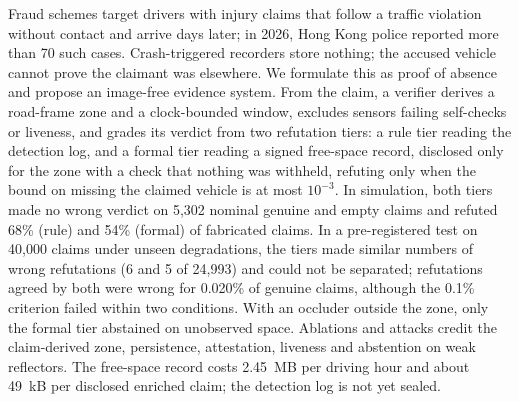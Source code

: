 Fraud schemes target drivers with injury claims that follow a traffic violation without contact and arrive days later; in 2026, Hong Kong police reported more than 70 such cases. Crash-triggered recorders store nothing; the accused vehicle cannot prove the claimant was elsewhere. We formulate this as proof of absence and propose an image-free evidence system. From the claim, a verifier derives a road-frame zone and a clock-bounded window, excludes sensors failing self-checks or liveness, and grades its verdict from two refutation tiers: a rule tier reading the detection log, and a formal tier reading a signed free-space record, disclosed only for the zone with a check that nothing was withheld, refuting only when the bound on missing the claimed vehicle is at most $10^{-3}$. In simulation, both tiers made no wrong verdict on 5,302 nominal genuine and empty claims and refuted 68\% (rule) and 54\% (formal) of fabricated claims. In a pre-registered test on 40,000 claims under unseen degradations, the tiers made similar numbers of wrong refutations (6 and 5 of 24,993) and could not be separated; refutations agreed by both were wrong for 0.020\% of genuine claims, although the 0.1\% criterion failed within two conditions. With an occluder outside the zone, only the formal tier abstained on unobserved space. Ablations and attacks credit the claim-derived zone, persistence, attestation, liveness and abstention on weak reflectors. The free-space record costs 2.45~MB per driving hour and about 49~kB per disclosed enriched claim; the detection log is not yet sealed.
